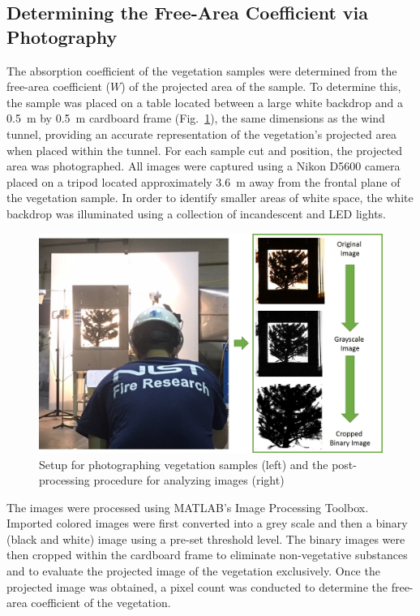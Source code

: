 \documentclass[12pt]{article}
\begin{document}
\subsection{Determining the Free-Area Coefficient via Photography}
\label{ssec:headingscap}

The absorption coefficient of the vegetation samples were determined from the free-area coefficient ($W$) of the projected area of the sample. To determine this, the sample was placed on a table located between a large white backdrop and a 0.5~m by 0.5~m cardboard frame (Fig.~\ref{fig:ImgAnaly}), the same dimensions as the wind tunnel, providing an accurate representation of the vegetation's projected area when placed within the tunnel. For each sample cut and position, the projected area was photographed. All images were captured using a Nikon D5600 camera placed on a tripod located approximately 3.6~\si{m} away from the frontal plane of the vegetation sample. In order to identify smaller areas of white space, the white backdrop was illuminated using a collection of incandescent and LED lights.

\begin{figure} [!h]
	\centering 	\includegraphics[width=1.0\linewidth]{Picture5.jpg}
	\caption[Setup for photographing vegetation samples]{Setup for photographing vegetation samples (left) and the post-processing procedure for analyzing images (right)}
	\label{fig:ImgAnaly}
\end{figure}

The images were processed using MATLAB's Image Processing Toolbox. Imported colored images were first converted into a grey scale and then a binary (black and white) image using a pre-set threshold level. The binary images were then cropped within the cardboard frame to eliminate non-vegetative substances and to evaluate the projected image of the vegetation exclusively. Once the projected image was obtained, a pixel count was conducted to determine the free-area coefficient of the vegetation.
\end{document}
